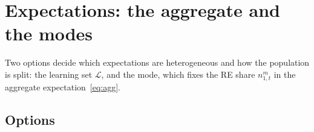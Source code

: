 \documentclass[11pt,a4paper]{article}
\begin{document}
\section{Expectations: the aggregate and the modes}\label{sec:expectations}

Two options decide which expectations are heterogeneous and how the population is split: the
learning set $\mathcal{L}$, and the mode, which fixes the RE share $n^m_{1,t}$ in the aggregate
expectation~\eqref{eq:agg}.

\subsection{Options}
\end{document}
